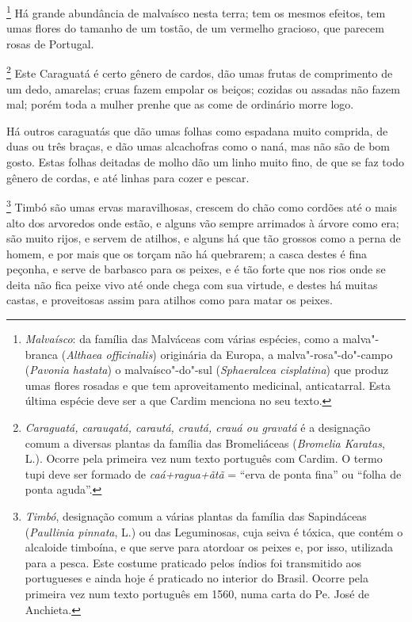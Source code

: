 \begin{linenumbers}
\footnote{ \textit{Malvaísco}: da família das
Malváceas com várias espécies, como a malva"-branca (\textit{Althaea
officinalis}) originária da Europa, a malva"-rosa"-do"-campo 
(\textit{Pavonia hastata}) o malvaísco"-do"-sul (\textit{Sphaeralcea
cisplatina}) que produz umas flores rosadas e que tem aproveitamento
medicinal, anticatarral. Esta última espécie deve ser a que Cardim
menciona no seu texto.} Há grande abundância de malvaísco
nesta terra; tem os mesmos efeitos, tem umas flores do tamanho de um
tostão, de um vermelho gracioso, que parecem rosas de Portugal.

\footnote{ \textit{Caraguatá, carauqatá, carautá,
crautá, crauá ou gravatá} é a designação comum a diversas plantas da
família das Bromeliáceas (\textit{Bromelia Karatas}, L.). Ocorre pela
primeira vez num texto português com Cardim. O termo tupi deve ser
formado de \textit{caá+ragua+ãtã} = ``erva de ponta fina'' ou ``folha de
ponta aguda''.} Este Caraguatá é certo gênero de cardos,
dão umas frutas de comprimento de um dedo, amarelas; cruas fazem
empolar os beiços; cozidas ou assadas não fazem mal; porém toda a
mulher prenhe que as come de ordinário morre logo.

 Há outros caraguatás que dão umas folhas como espadana muito comprida,
de duas ou três braças, e dão umas alcachofras como o naná, mas não são
de bom gosto. Estas folhas deitadas de molho dão um linho muito fino,
de que se faz todo gênero de cordas, e até linhas para cozer e pescar. 

\footnote{ \textit{Timbó}, designação comum a várias
plantas da família das Sapindáceas (\textit{Paullinia pinnata}, L.) 
ou das Leguminosas, cuja seiva é tóxica, que contém o
alcaloide timboína, e que serve para atordoar os peixes e, por isso,
utilizada para a pesca. Este costume praticado pelos índios foi
transmitido aos portugueses e ainda hoje é praticado no interior do
Brasil. Ocorre pela primeira vez num texto português em 1560, numa
carta do Pe. José de Anchieta.} Timbó são umas
ervas maravilhosas, crescem do chão como cordões até o mais alto dos
arvoredos onde estão, e alguns vão sempre arrimados à árvore como era;
são muito rijos, e servem de atilhos, e alguns há que tão grossos como a
perna de homem, e por mais que os torçam não há quebrarem; a casca
destes é fina peçonha, e serve de barbasco para os peixes, e é tão
forte que nos rios onde se deita não fica peixe vivo até onde chega
com sua virtude, e destes há muitas castas, e proveitosas assim para
atilhos como para matar os peixes. 


\end{linenumbers}
